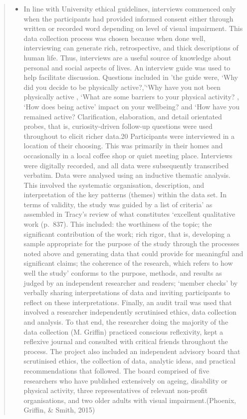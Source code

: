 \documentclass[a4paper,]{book}
\providecommand{\tightlist}{%
  \setlength{\itemsep}{0pt}\setlength{\parskip}{0pt}}
\begin{document}
\begin{quote}
\begin{itemize}
\tightlist
\item
  In line with University ethical guidelines, interviews commenced only when the participants had provided informed consent either through written or recorded word depending on level of visual impairment. This data collection process was chosen because when done well, interviewing can generate rich, retrospective, and thick descriptions of human life. Thus, interviews are a useful source of knowledge about personal and social aspects of lives. An interview guide was used to help facilitate discussion. Questions included in 'the guide were, `Why did you decide to be physically active?,'`Why have you not been physically active , `What are some barriers to your physical activity? , `How does being active' impact on your wellbeing? and `How have you remained active? Clarification, elaboration, and detail orientated probes, that is, curiosity-driven follow-up questions were used throughout to elicit richer data.20 Participants were interviewed in a location of their choosing. This was primarily in their homes and occasionally in a local coffee shop or quiet meeting place. Interviews were digitally recorded, and all data were subsequently transcribed verbatim. Data were analysed using an inductive thematic analysis. This involved the systematic organisation, description, and interpretation of the key patterns (themes) within the data set. In terms of validity, the study was guided by a list of criteria' as assembled in Tracy's review of what constitutes `excellent qualitative work (p.~837). This included: the worthiness of the topic; the significant contribution of the work; rich rigor, that is, developing a sample appropriate for the purpose of the study through the processes noted above and generating data that could provide for meaningful and significant claims; the coherence of the research, which refers to how well the study' conforms to the purpose, methods, and results as judged by an independent researcher and readers; `member checks' by verbally sharing interpretations of data and inviting participants to reflect on these interpretations. Finally, an audit trail was used that involved a researcher independently scrutinised ethics, data collection and analysis. To that end, the researcher doing the majority of the data collection (M. Griffin) practiced conscious reflexivity, kept a reflexive journal and consulted with critical friends throughout the process. The project also included an independent advisory board that scrutinised ethics, the collection of data, analytic ideas, and practical recommendations that followed. The board comprised of five researchers who have published extensively on ageing, disability or physical activity, three representatives of relevant non-profit organisations, and two older adults with visual impairment.(Phoenix, Griffin, \& Smith, 2015)
\end{itemize}
\end{quote}
\end{document}
